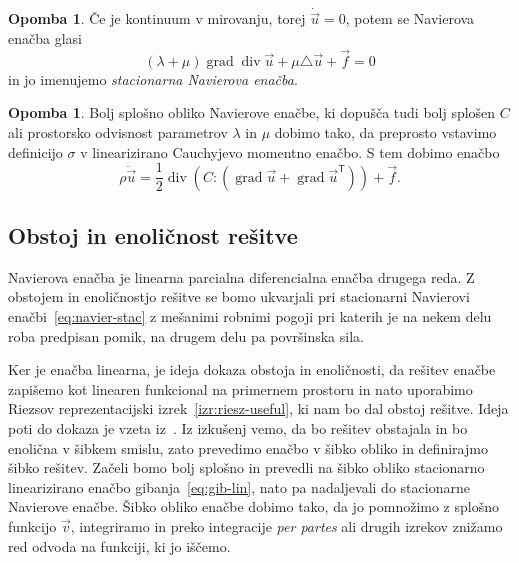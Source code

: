 \documentclass[12pt,a4paper,twoside]{article}
\theoremstyle{definition} %
\newtheorem{opomba}[definicija]{Opomba}
\theoremstyle{plain} %
\numberwithin{equation}{section}
\newcommand{\T}{\mathsf{T}}
\newcommand{\lap}{\triangle}
\renewcommand{\div}{\operatorname{div}}
\newcommand{\grad}{\operatorname{grad}}
\newcommand{\vv}{\vec{v}}
\newcommand{\vu}{\vec{u}}
\newcommand{\vf}{\vec{f}}
\newcommand{\ts}{\sigma}
\begin{document}
\begin{opomba}
  Če je kontinuum v mirovanju, torej $\dot{\vu} = 0$, potem se Navierova enačba glasi
\begin{equation}
    (\lambda + \mu)\grad\div \vu + \mu \lap \vu + \vf  = 0
  \label{eq:navier-stac}
\end{equation}
in jo imenujemo \emph{stacionarna Navierova enačba}.
\end{opomba}
\begin{opomba}
  Bolj splošno obliko Navierove enačbe, ki dopušča tudi bolj splošen $C$ ali
  prostorsko odvisnost parametrov $\lambda$ in $\mu$
  dobimo tako, da preprosto vstavimo definicijo $\ts$ v linearizirano
  Cauchyjevo momentno enačbo. S tem dobimo enačbo
  \begin{equation}
    \rho\ddot \vu = \frac12 \div(C:(\grad \vu + \grad\vu^\T)) + \vf.
    \label{eq:navier-general}
  \end{equation}
\end{opomba}

\subsection{Obstoj in enoličnost rešitve}
\label{sec:obstoj-enol}
Navierova enačba je linearna parcialna diferencialna enačba drugega reda.
Z obstojem in enoličnostjo rešitve se bomo ukvarjali pri stacionarni Navierovi
enačbi~\eqref{eq:navier-stac} z mešanimi robnimi pogoji pri katerih je na nekem
delu roba predpisan pomik, na drugem delu pa površinska sila.

Ker je enačba linearna, je ideja dokaza obstoja in enoličnosti, da rešitev
enačbe zapišemo kot linearen funkcional na primernem prostoru in nato uporabimo
Riezsov reprezentacijski izrek~\ref{izr:riesz-useful}, ki nam bo dal obstoj
rešitve. Ideja poti do dokaza je vzeta iz~\cite[izrek 3.17.1, str.\
232]{lebedev2009introduction}. Iz izkušenj vemo, da bo rešitev obstajala in bo
enolična v šibkem smislu, zato prevedimo enačbo v šibko obliko in definirajmo
šibko rešitev. Začeli bomo bolj splošno in prevedli na šibko obliko
stacionarno linearizirano enačbo gibanja~\eqref{eq:gib-lin}, nato pa nadaljevali
do stacionarne Navierove enačbe. Šibko obliko enačbe dobimo tako, da jo pomnožimo z splošno
funkcijo $\vv$, integriramo in preko integracije \emph{per partes} ali drugih
izrekov znižamo red odvoda na funkciji, ki jo iščemo.
\end{document}
